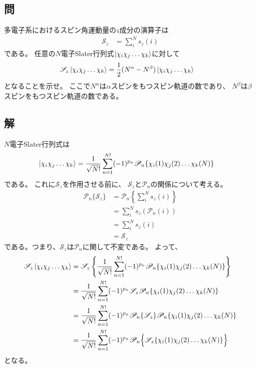 \subsection{問}
多電子系におけるスピン角運動量の$z$成分の演算子は
\begin{align}
	\mathscr{S}_z
&=
	\sum_i^N
		s_z(i)
\end{align}
である。
任意の$N$電子Slater行列式$\ket{\chi_i\chi_j\dots\chi_k}$に対して
\begin{align}
	\mathscr{S}_z \ket{\chi_i\chi_j\dots\chi_k}
&=
	\frac{1}{2}
	(N^{\alpha} -N^{\beta})
	\ket{\chi_i\chi_j\dots\chi_k}
\end{align}
となることを示せ。
ここで$N^{\alpha}$は$\alpha$スピンをもつスピン軌道の数であり、
$N^{\beta}$は$\beta$スピンをもつスピン軌道の数である。

\subsection{解}
$N$電子Slater行列式は
\begin{align}
	\ket{\chi_i\chi_j\dots\chi_k}
&=
	\frac{1}{\sqrt{N!}}
	\sum_{n=1}^{N!}
		(-1)^{p_n}
		\mathscr{P}_n\{
			\chi_i(1) \chi_j(2) \dots \chi_k(N)
		\}
\end{align}
である。
これに$\mathscr{S}_z$を作用させる前に、
$\mathscr{S}_z$と$\mathscr{P}_n$の関係について考える。
\begin{align}
	\mathscr{P}_n\{\mathscr{S}_z\}
&=
	\mathscr{P}_n\left\{
		\sum_i^N s_z(i)
	\right\} \\
%
%
&=
	\sum_i^N s_z(\mathscr{P}_n(i)) \\
%
%
&=
	\sum_i^N s_z(i) \\
%
%
&=
	\mathscr{S}_z
\end{align}
である。つまり、$\mathscr{S}_z$は$\mathscr{P}_n$に関して不変である。
よって、
\begin{align}
	\mathscr{S}_z \ket{\chi_i\chi_j\dots\chi_k}
&=
	\mathscr{S}_z\left\{
		\frac{1}{\sqrt{N!}}
		\sum_{n=1}^{N!}
			(-1)^{p_n}
			\mathscr{P}_n\{
				\chi_i(1) \chi_j(2) \dots \chi_k(N)
			\}
	\right\} \\
%
%
&=
	\frac{1}{\sqrt{N!}}
	\sum_{n=1}^{N!}
		(-1)^{p_n}
		\mathscr{S}_z
		\mathscr{P}_n\{
			\chi_i(1) \chi_j(2) \dots \chi_k(N)
		\} \\
%
%
&=
	\frac{1}{\sqrt{N!}}
	\sum_{n=1}^{N!}
		(-1)^{p_n}
		\mathscr{P}_n\{\mathscr{S}_z\}
		\mathscr{P}_n\{
			\chi_i(1) \chi_j(2) \dots \chi_k(N)
		\} \\
%
%
&=
	\frac{1}{\sqrt{N!}}
	\sum_{n=1}^{N!}
		(-1)^{p_n}
		\mathscr{P}_n\Bigl\{
			\mathscr{S}_z\{
				\chi_i(1) \chi_j(2) \dots \chi_k(N)
			\}
		\Bigr\}
\end{align}
となる。


